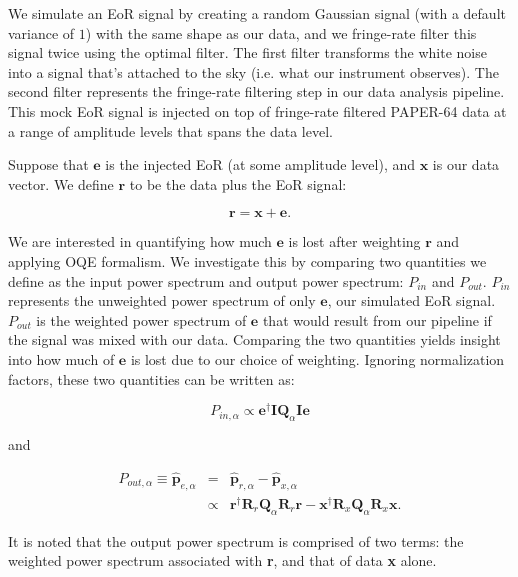 \documentclass[preprint2,numberedappendix,tighten]{aastex6}  %
\begin{document}
We simulate an EoR signal by creating a random Gaussian signal (with a default variance of $1$) with the same shape as our data, and we fringe-rate filter this signal twice using the optimal filter. The first filter transforms the white noise into a signal that's attached to the sky (i.e. what our instrument observes). The second filter represents the fringe-rate filtering step in our data analysis pipeline. This mock EoR signal is injected on top of fringe-rate filtered PAPER-64 data at a range of amplitude levels that spans the data level.

Suppose that $\textbf{e}$ is the injected EoR (at some amplitude level), and $\textbf{x}$ is our data vector. We define $\textbf{r}$ to be the data plus the EoR signal:

\begin{equation}
\textbf{r} = \textbf{x} + \textbf{e}.
\end{equation}

We are interested in quantifying how much $\textbf{e}$ is lost after weighting $\textbf{r}$ and applying OQE formalism. We investigate this by comparing two quantities we define as the input power spectrum and output power spectrum: $P_{in}$ and $P_{out}$. $P_{in}$ represents the unweighted power spectrum of only $\textbf{e}$, our simulated EoR signal. $P_{out}$ is the weighted power spectrum of $\textbf{e}$ that would result from our pipeline if the signal was mixed with our data. Comparing the two quantities yields insight into how much of $\textbf{e}$ is lost due to our choice of weighting. Ignoring normalization factors, these two quantities can be written as:

\begin{equation}
\label{eq:Pin}
P_{in,\alpha} \propto \textbf{e}^{\dagger}\textbf{I}\textbf{Q}_{\alpha}\textbf{I}\textbf{e}
\end{equation}

\noindent and

\begin{eqnarray}
\label{eq:sigloss}
P_{out,\alpha} \equiv \hat{\textbf{p}}_{e,\alpha} &=& \hat{\textbf{p}}_{r,\alpha}-\hat{\textbf{p}}_{x,\alpha} \nonumber \\
&\propto& \textbf{r}^{\dagger}\textbf{R}_{r}\textbf{Q}_{\alpha}\textbf{R}_{r}\textbf{r} - \textbf{x}^{\dagger}\textbf{R}_{x}\textbf{Q}_{\alpha}\textbf{R}_{x}\textbf{x}.
\end{eqnarray}

It is noted that the output power spectrum is comprised of two terms: the weighted power spectrum associated with \textbf{r}, and that of data \textbf{x} alone. 
\end{document}
